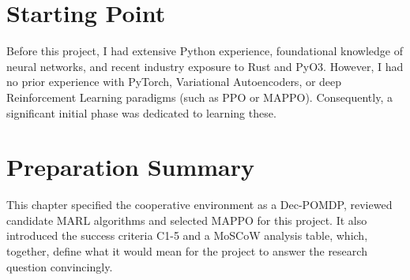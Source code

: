 

\section{Starting Point}
\label{sec:2.7}

Before this project, I had extensive Python experience, foundational knowledge of neural networks, and recent industry exposure to Rust and PyO3.
However, I had no prior experience with PyTorch, Variational Autoencoders, or deep Reinforcement Learning paradigms (such as PPO or MAPPO).
Consequently, a significant initial phase was dedicated to learning these.

\section{Preparation Summary}
\label{sec:2.8}

This chapter specified the cooperative environment as a Dec-POMDP, reviewed candidate MARL algorithms and selected MAPPO for this project.
It also introduced the success criteria C1-5 and a MoSCoW analysis table, which, together, define what it would mean for the project to answer the research question convincingly.